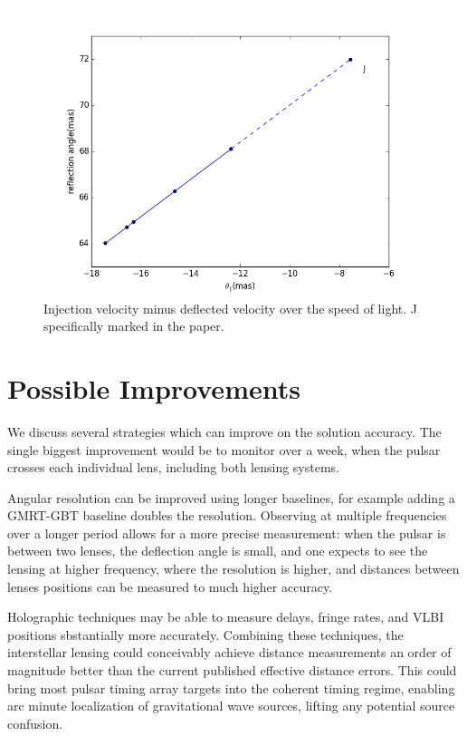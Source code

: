 \documentclass{emulateapj}
\begin{document}
\begin{figure}
\centering
\includegraphics[width=1.0\textwidth,angle=0]{Reflection_angle.png}
\caption{Injection velocity minus deflected velocity over the speed of light. J specifically marked in the paper.}
\label{vtrans}
\end{figure}



\section{Possible Improvements}

We discuss several strategies which can improve on the solution
accuracy.  The single biggest improvement would be to monitor over a
week, when the pulsar crosses each individual lens, including both
lensing systems.

Angular resolution can be improved using longer baselines, for example
adding a GMRT-GBT baseline doubles the resolution.  Observing at
multiple frequencies over a longer period allows for a more precise
measurement: when the pulsar is between two lenses, the deflection
angle is small, and one expects to see the lensing at higher
frequency, where the resolution is higher, and distances between
lenses positions can be measured to much higher accuracy.

Holographic techniques\citep{2008MNRAS.388.1214W,2014MNRAS.440L..36P}
may be able to measure delays, fringe rates, and VLBI positions
sbstantially more accurately.  Combining these techniques, the
interstellar lensing could conceivably achieve distance measurements
an order of magnitude better than the current published effective
distance errors.  This could bring most pulsar timing array targets
into the coherent timing regime, enabling arc minute localization of
gravitational wave sources, lifting any potential source confusion.
\end{document}
